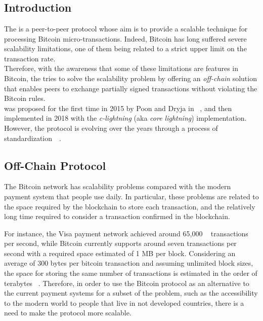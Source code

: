 \chapter{{\LN}}\label{sec:lightning_network}

\section{Introduction}

The \emph{{\LN}} is a peer-to-peer protocol whose aim is to provide a scalable technique for processing Bitcoin micro-transactions. Indeed, Bitcoin has long suffered severe scalability limitations, one of them being related to a strict upper limit on the transaction rate.\\
Therefore, with the awareness that some of these limitations are features in Bitcoin, the {\LN} tries to solve
the scalability problem by offering an \emph{off-chain} solution that enables peers to exchange partially
signed transactions without violating the Bitcoin rules.\\
{\LN} was proposed for the first time in 2015 by Poon and Dryja in  ~\cite{lightning-network-paper},
and then implemented in 2018 with the \emph{c-lightning} (aka \emph{core lightning}) implementation.
However, the protocol is evolving over the years through a process of standardization~~\cite{lightning-bolts}.

\section{Off-Chain Protocol}

The Bitcoin network has scalability problems compared with the modern payment system that people use daily.
In particular, these problems are related to the space required by the blockchain to store each transaction,
and the relatively long time required to consider a transaction confirmed in the blockchain.

For instance, the Visa payment network achieved around 65,000 ~\cite{visa-sheet} transactions per second, while
Bitcoin currently supports around seven transactions per second with a required space estimated of 1 MB per block. Considering
an average of 300 bytes per bitcoin transaction and assuming unlimited block sizes, the space for storing the same number
of transactions is estimated in the order of terabytes ~\cite{lightning-network-paper}. Therefore, in order to use the Bitcoin
protocol as an alternative to the current payment systems for a subset of the problem, such as the accessibility to the modern world
to people that live in not developed countries, there is a need to make the protocol more scalable.

